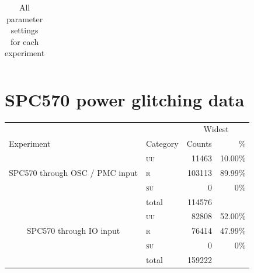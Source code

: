 \documentclass[10pt]{article}
\newcommand{\ST}{SPC570\xspace}
\newcommand{\UU}{\textsc{uu}\xspace}
\newcommand{\SU}{\textsc{su}\xspace}
\newcommand{\R}{\textsc{r}\xspace}
\begin{document}
\begin{appendices}
\begin{table}[H]
\begin{tabular}{ll rr rr rr rr}
    \bottomrule
    \end{tabular}
    \caption{All parameter settings for each experiment}
    \label{tab:all-params}
  \end{table}

  \newpage

  \section{\ST power glitching data}
  \label{apdx:st-power} 
    \begin{table}[H]
      \centering
      \begin{tabular}{ll rr}
      \toprule

        &  & \multicolumn{2}{c}{Widest }        
             \\
             \cmidrule(lr){3-4}                    
             
        Experiment & \multicolumn{1}{c}{Category}  & 
        \multicolumn{1}{c}{Counts}      & \multicolumn{1}{r}{\%}          
        \\

      \midrule

      \multicolumn{1}{c}{\multirow{3}{*}{ \parbox{2cm}{\ST through OSC / PMC input}}}

      & \UU    
      & 11463  & 10.00\%                   
      \\
      & \R   
      & 103113  & 89.99\%                   
      \\
      & \SU      
      & 0   & 0\%                   
      \\

      \cmidrule(l){2-4}
      & total    
      & 114576 &                            
      \\       

      \midrule

      \multicolumn{1}{c}{\multirow{3}{*}{ \parbox{2cm}{\ST through IO input}}}

      & \UU    
      & 82808  & 52.00\%                   
      \\
      & \R   
      & 76414  & 47.99\%                   
      \\
      & \SU      
      & 0   & 0\%                   
      \\

      \cmidrule(l){2-4}
      & total    
      & 159222 &                            
      \\       


\end{tabular}
\end{table}
\end{appendices}
\end{document}
